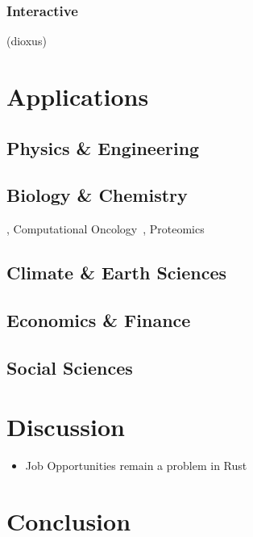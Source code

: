 \documentclass{article}
\begin{document}
\subsubsection{Interactive}
(dioxus)

\section{Applications}
\label{section:applications}

\subsection{Physics \& Engineering}
\subsection{Biology \& Chemistry}
\cite{Pleyer2024}, Computational Oncology~\cite{Köster2025}, Proteomics~\cite{Anechitoaie2024}
\subsection{Climate \& Earth Sciences}
\subsection{Economics \& Finance}
\subsection{Social Sciences}

\section{Discussion}
\label{section:discussion}

\begin{itemize}
    \item Job Opportunities remain a problem in Rust
\end{itemize}

\section{Conclusion}
\label{section:conclusion}
\end{document}
